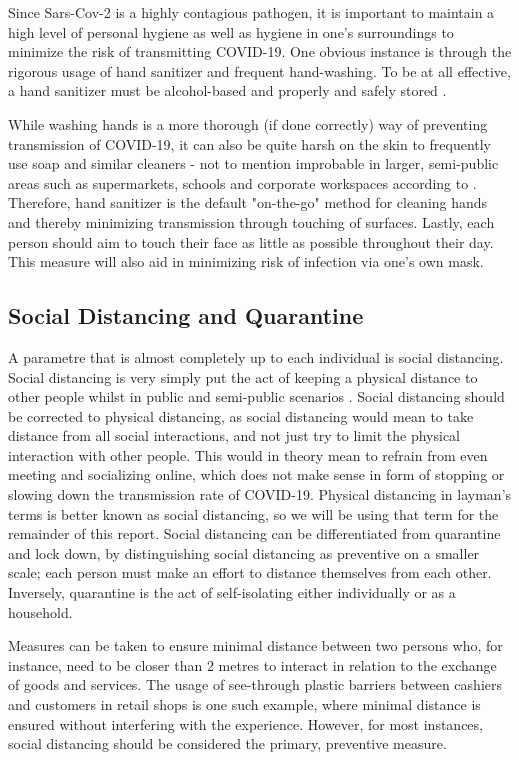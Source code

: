 Since Sars-Cov-2 is a highly contagious pathogen, it is important to maintain a high level of personal hygiene as well as hygiene in one's surroundings to minimize the risk of transmitting COVID-19. One obvious instance is through the rigorous usage of hand sanitizer and frequent hand-washing. To be at all effective, a hand sanitizer must be alcohol-based and properly and safely stored \citep{gharpure_knowledge_2020}.

While washing hands is a more thorough (if done correctly) way of preventing transmission of COVID-19, it can also be quite harsh on the skin to frequently use soap and similar cleaners - not to mention improbable in larger, semi-public areas such as supermarkets, schools and corporate workspaces according to \cite{cavanagh_rational_2020}. Therefore, hand sanitizer is the default "on-the-go" method for cleaning hands and thereby minimizing transmission through touching of surfaces. Lastly, each person should aim to touch their face as little as possible throughout their day. This measure will also aid in minimizing risk of infection via one's own mask.

\subsection{Social Distancing and Quarantine}
A parametre that is almost completely up to each individual is social distancing. Social distancing is very simply put the act of keeping a physical distance to other people whilst in public and semi-public scenarios \citep{ayenigbara_covid-19_2020}. Social distancing should be corrected to physical distancing, as social distancing would mean to take distance from all social interactions, and not just try to limit the physical interaction with other people. This would in theory mean to refrain from even meeting and socializing online, which does not make sense in form of stopping or slowing down the transmission rate of COVID-19. Physical distancing in layman's terms is better known as social distancing, so we will be using that term for the remainder of this report. Social distancing can be differentiated from quarantine and lock down, by distinguishing social distancing as preventive on a smaller scale; each person must make an effort to distance themselves from each other. Inversely, quarantine is the act of self-isolating either individually or as a household.

Measures can be taken to ensure minimal distance between two persons who, for instance, need to be closer than 2 metres to interact in relation to the exchange of goods and services. The usage of see-through plastic barriers between cashiers and customers in retail shops is one such example, where minimal distance is ensured without interfering with the experience. However, for most instances, social distancing should be considered the primary, preventive measure.

